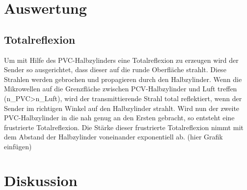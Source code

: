 \newpage
\section{Auswertung}
\subsection{Totalreflexion}
Um mit Hilfe des PVC-Halbzylinders eine Totalreflexion zu erzeugen wird der Sender so ausgerichtet, dass dieser  auf die runde Oberfläche strahlt. Diese Strahlen werden gebrochen und propagieren durch den Halbzylinder.
Wenn die Mikrowellen auf die Grenzfläche zwischen PCV-Halbzylinder und Luft treffen (n_{PVC}>n_{Luft}), wird der transmittierende Strahl total reflektiert, wenn der Sender im richtigen Winkel auf den Halbzylinder strahlt.
Wird nun der zweite PVC-Halbzylinder in die nah genug an den Ersten gebracht, so entsteht eine frustrierte Totalreflexion.
Die Stärke dieser frustrierte Totalreflexion nimmt mit dem Abstand der Halbzylinder voneinander exponentiell ab.
(hier Grafik einfügen)



\newpage
\section{Diskussion} 